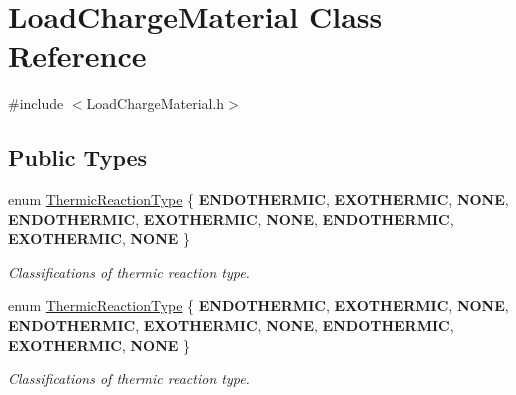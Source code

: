 \hypertarget{class_load_charge_material}{}\section{Load\+Charge\+Material Class Reference}
\label{class_load_charge_material}


{\ttfamily \#include $<$Load\+Charge\+Material.\+h$>$}

\subsection*{Public Types}
\begin{DoxyCompactItemize}
\item 
\mbox{\label{class_load_charge_material_a51d4263e865a5d86236622dd3fe23fd1}} 
enum \hyperlink{class_load_charge_material_a51d4263e865a5d86236622dd3fe23fd1}{Thermic\+Reaction\+Type} \{ \newline
{\bfseries E\+N\+D\+O\+T\+H\+E\+R\+M\+IC}, 
{\bfseries E\+X\+O\+T\+H\+E\+R\+M\+IC}, 
{\bfseries N\+O\+NE}, 
{\bfseries E\+N\+D\+O\+T\+H\+E\+R\+M\+IC}, 
\newline
{\bfseries E\+X\+O\+T\+H\+E\+R\+M\+IC}, 
{\bfseries N\+O\+NE}, 
{\bfseries E\+N\+D\+O\+T\+H\+E\+R\+M\+IC}, 
{\bfseries E\+X\+O\+T\+H\+E\+R\+M\+IC}, 
\newline
{\bfseries N\+O\+NE}
 \}\begin{DoxyCompactList}\small\item\em Classifications of thermic reaction type. \end{DoxyCompactList}
\item 
\mbox{\label{class_load_charge_material_a51d4263e865a5d86236622dd3fe23fd1}} 
enum \hyperlink{class_load_charge_material_a51d4263e865a5d86236622dd3fe23fd1}{Thermic\+Reaction\+Type} \{ \newline
{\bfseries E\+N\+D\+O\+T\+H\+E\+R\+M\+IC}, 
{\bfseries E\+X\+O\+T\+H\+E\+R\+M\+IC}, 
{\bfseries N\+O\+NE}, 
{\bfseries E\+N\+D\+O\+T\+H\+E\+R\+M\+IC}, 
\newline
{\bfseries E\+X\+O\+T\+H\+E\+R\+M\+IC}, 
{\bfseries N\+O\+NE}, 
{\bfseries E\+N\+D\+O\+T\+H\+E\+R\+M\+IC}, 
{\bfseries E\+X\+O\+T\+H\+E\+R\+M\+IC}, 
\newline
{\bfseries N\+O\+NE}
 \}\begin{DoxyCompactList}\small\item\em Classifications of thermic reaction type. \end{DoxyCompactList}

\end{DoxyCompactItemize}
